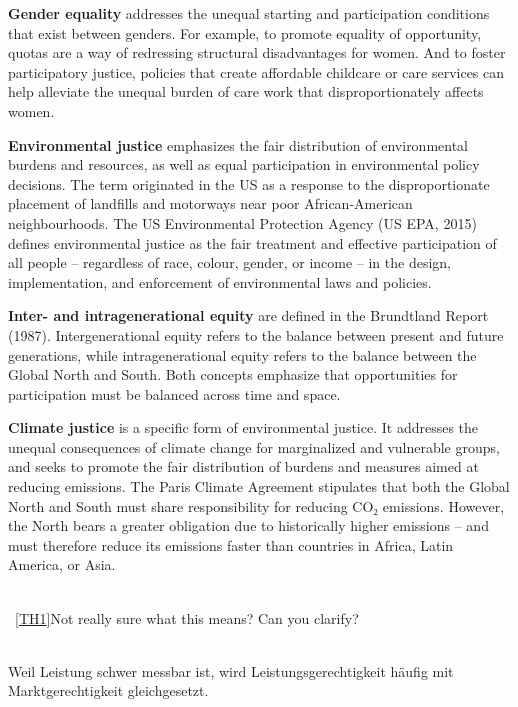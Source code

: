 \documentclass[
  a4paper,
  openany]{book}
\begin{document}
\begin{tcolorbox}
\textbf{Gender equality} addresses the unequal starting and
participation conditions that exist between genders. For example, to
promote equality of opportunity, quotas are a way of redressing
structural disadvantages for women. And to foster participatory justice,
policies that create affordable childcare or care services can help
alleviate the unequal burden of care work that disproportionately
affects women.

\textbf{Environmental justice} emphasizes the fair distribution of
environmental burdens and resources, as well as equal participation in
environmental policy decisions. The term originated in the US as a
response to the disproportionate placement of landfills and motorways
near poor African-American neighbourhoods. The US Environmental
Protection Agency (US EPA, 2015) defines environmental justice as the
fair treatment and effective participation of all people -- regardless
of race, colour, gender, or income -- in the design, implementation, and
enforcement of environmental laws and policies.

\textbf{Inter- and intragenerational equity} are defined in the
Brundtland Report (1987). Intergenerational equity refers to the balance
between present and future generations, while intragenerational equity
refers to the balance between the Global North and South. Both concepts
emphasize that opportunities for participation must be balanced across
time and space.

\textbf{Climate justice} is a specific form of environmental justice. It
addresses the unequal consequences of climate change for marginalized
and vulnerable groups, and seeks to promote the fair distribution of
burdens and measures aimed at reducing emissions. The Paris Climate
Agreement stipulates that both the Global North and South must share
responsibility for reducing CO₂ emissions. However, the North bears a
greater obligation due to historically higher emissions -- and must
therefore reduce its emissions faster than countries in Africa, Latin
America, or Asia.\\
\strut \\

~\hyperref[_msoanchor_1]{{[}TH1{]}}Not really sure what this means? Can
you clarify?\\
\strut \\

Weil Leistung schwer messbar ist, wird Leistungsgerechtigkeit häufig mit
Marktgerechtigkeit gleichgesetzt.

\end{tcolorbox}
\end{document}
